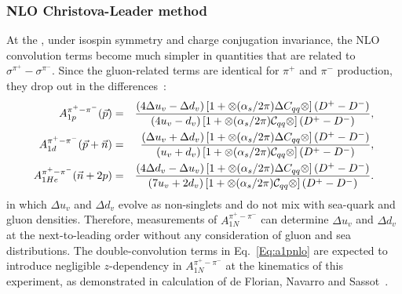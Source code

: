 \subsubsection{NLO Christova-Leader method}
At the \nloo, under isospin symmetry and charge conjugation invariance, 
the NLO convolution terms become much simpler in quantities that 
are related to $\sigma^{\pi^+} - \sigma^{\pi^-}$. Since the gluon-related terms  
  are identical for  
$\pi^+$ and $\pi^-$ production, they drop out in the differences~\cite{leader2}:
 \begin{eqnarray}
\label{Eq:a1pnlo}
A_{1p}^{\pi^+ - \pi^-}({\vec p}) & = &  { (4 \Delta u_v -\Delta d_v) \left[ 1+ \otimes (\alpha_s/2\pi) \Delta C_{qq}
\otimes \right] (D^+ -D^-) \over { (4 u_v - d_v) \left[ 1+ \otimes (\alpha_s/2\pi) {\cal C}_{qq}
\otimes \right] (D^+ - D^-) } },  \\ 
A_{1d}^{\pi^+ - \pi^-}({\vec p}+ {\vec n}) & = &  { (\Delta u_v + \Delta d_v) \left[ 1+ \otimes (\alpha_s/2\pi) \Delta C_{qq}
\otimes \right] (D^+ -D^-)  \over { (u_v + d_v) \left[ 1+ \otimes (\alpha_s/2\pi) {\cal C}_{qq}
\otimes \right] (D^+ -D^-) } },  \\
A_{1He}^{\pi^+ - \pi^-}({\vec n}+2p) & = &  { (4 \Delta d_v - \Delta u_v) \left[ 1+ \otimes (\alpha_s/2\pi) \Delta C_{qq}
\otimes \right] (D^+ -D^-)  \over { (7 u_v + 2 d_v) \left[ 1+ \otimes (\alpha_s/2\pi) {\cal C}_{qq}
\otimes \right] (D^+ -D^-) } }.
\end{eqnarray}
in which $\Delta u_v$ and $\Delta d_v$ evolve as non-singlets and do not mix with 
sea-quark and gluon densities. Therefore, measurements of $A_{1N}^{\pi^+ - \pi^-}$ 
can determine $\Delta u_v$ and $\Delta d_v$ at the next-to-leading order
without any consideration of gluon and sea distributions.
The double-convolution terms in Eq.~\ref{Eq:a1pnlo} are expected to introduce negligible
$z$-dependency in $A_{1N}^{\pi^+ - \pi^-}$ at the kinematics of this experiment, 
as demonstrated in calculation of de Florian, Navarro and Sassot~\cite{sassotnlo}.

